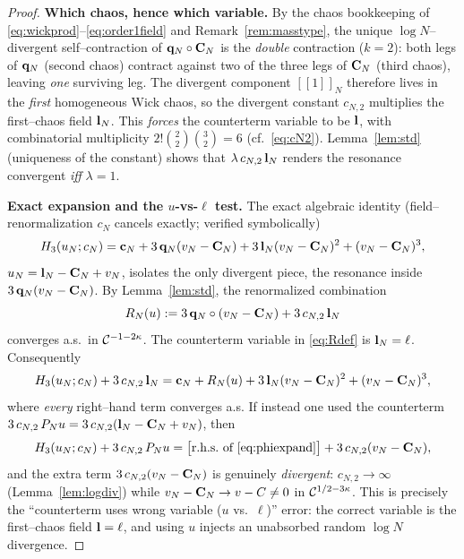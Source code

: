 \begin{proof}
\textbf{Which chaos, hence which variable.}
By the chaos bookkeeping of \eqref{eq:wickprod}--\eqref{eq:order1field} and
Remark~\ref{rem:masstype}, the unique $\log N$--divergent self--contraction of
$\mathbf{q}_N\circ\mathbf{C}_N$ is the \emph{double} contraction ($k=2$): both legs of
$\mathbf{q}_N$ (second chaos) contract against two of the three legs of $\mathbf{C}_N$
(third chaos), leaving \emph{one} surviving leg. The divergent component
$[\![1]\!]_N$ therefore lives in the \emph{first} homogeneous Wick chaos, so the
divergent constant $c_{N,2}$ multiplies the first--chaos field $\mathbf{l}_N$. This
\emph{forces} the counterterm variable to be $\mathbf{l}$, with combinatorial
multiplicity $2!\binom22\binom32=6$ (cf.\ \eqref{eq:cN2}). Lemma~\ref{lem:std}
(uniqueness of the constant) shows that $\lambda\,c_{N,2}\,\mathbf{l}_N$ renders the
resonance convergent \emph{iff} $\lambda=1$.

\medskip
\textbf{Exact expansion and the $u$-vs-$\ell$ test.}
The exact algebraic identity (field--renormalization $c_N$ cancels exactly;
verified symbolically)
\begin{equation}\label{eq:cubeexp}
H_3(u_N;c_N)=\mathbf{c}_N+3\,\mathbf{q}_N(v_N-\mathbf{C}_N)+3\,\mathbf{l}_N(v_N-\mathbf{C}_N)^2+(v_N-\mathbf{C}_N)^3 ,
\end{equation}
$u_N=\mathbf{l}_N-\mathbf{C}_N+v_N$, isolates the only divergent piece, the resonance
inside $3\,\mathbf{q}_N(v_N-\mathbf{C}_N)$. By Lemma~\ref{lem:std}, the renormalized
combination
\begin{equation}\label{eq:Rdef}
R_N(u):=3\,\mathbf{q}_N\circ(v_N-\mathbf{C}_N)+3\,c_{N,2}\,\mathbf{l}_N
\end{equation}
converges a.s.\ in $\mathcal{C}^{-1-2\kappa}$. The counterterm variable in
\eqref{eq:Rdef} is $\mathbf{l}_N=\ell$. Consequently
\begin{equation}\label{eq:phiexpand}
H_3(u_N;c_N)+3\,c_{N,2}\,\mathbf{l}_N
=\mathbf{c}_N+R_N(u)+3\,\mathbf{l}_N(v_N-\mathbf{C}_N)^2+(v_N-\mathbf{C}_N)^3 ,
\end{equation}
where \emph{every} right--hand term converges a.s. If instead one used the
counterterm $3\,c_{N,2}\,P_N u=3\,c_{N,2}(\mathbf{l}_N-\mathbf{C}_N+v_N)$, then
\[
H_3(u_N;c_N)+3\,c_{N,2}\,P_N u
=\bigl[\text{r.h.s.\ of \eqref{eq:phiexpand}}\bigr]+3\,c_{N,2}(v_N-\mathbf{C}_N),
\]
and the extra term $3\,c_{N,2}(v_N-\mathbf{C}_N)$ is genuinely \emph{divergent}:
$c_{N,2}\to\infty$ (Lemma~\ref{lem:logdiv}) while $v_N-\mathbf{C}_N\to v-C\neq0$ in
$\mathcal{C}^{1/2-3\kappa}$. This is precisely the ``counterterm uses wrong variable
($u$ vs.\ $\ell$)'' error: the correct variable is the first--chaos field
$\mathbf{l}=\ell$, and using $u$ injects an unabsorbed random $\log N$ divergence.


\end{proof}
